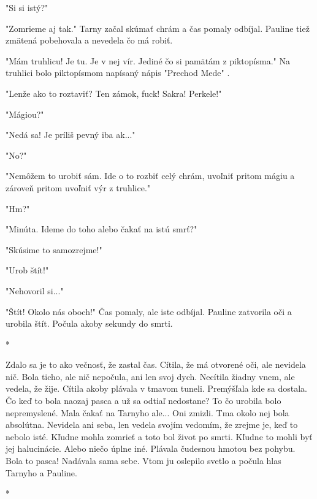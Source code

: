 \documentclass{book}
\begin{document}
"$ $Si si istý?"$ $ 

"$ $Zomrieme aj tak."$ $  Tarny začal skúmať chrám a čas pomaly odbíjal. Pauline tiež zmätená pobehovala a nevedela čo má robiť.

"$ $Mám truhlicu! Je tu. Je v nej vír. Jediné čo si pamätám z piktopísma."$ $  Na truhlici bolo piktopísmom napísaný nápis "$ $Prechod Mede"$ $ .

"$ $Lenže ako to roztaviť? Ten zámok, fuck! Sakra! Perkele!"$ $ 

"$ $Mágiou?"$ $ 

"$ $Nedá sa! Je príliš pevný iba ak..."$ $ 

"$ $No?"$ $ 

"$ $Nemôžem to urobiť sám. Ide o to rozbiť celý chrám, uvoľniť pritom mágiu a zároveň pritom uvoľniť výr z truhlice."$ $ 

"$ $Hm?"$ $ 

"$ $Minúta. Ideme do toho alebo čakať na istú smrť?"$ $ 

"$ $Skúsime to samozrejme!"$ $ 

"$ $Urob štít!"$ $ 

"$ $Nehovoril si..."$ $ 

"$ $Štít! Okolo nás oboch!"$ $  Čas pomaly, ale iste odbíjal. Pauline zatvorila oči a urobila štít. Počula akoby sekundy do smrti.

\begin{center}

*

\end{center}

Zdalo sa je to ako večnosť, že zastal čas. Cítila, že má otvorené oči, ale nevidela nič. Bola ticho, ale nič nepočula, ani len svoj dych. Necítila žiadny vnem, ale vedela, že žije. Cítila akoby plávala v tmavom tuneli. Premýšľala kde sa dostala. Čo keď to bola naozaj pasca a už sa odtiaľ nedostane? To čo urobila bolo nepremyslené. Mala čakať na Tarnyho ale... Oni zmizli. Tma okolo nej bola absolútna. Nevidela ani seba, len vedela svojím vedomím, že zrejme je, keď to nebolo isté. Kľudne mohla zomrieť a toto bol život po smrti. Kľudne to mohli byť jej halucinácie. Alebo niečo úplne iné. Plávala čudesnou hmotou bez pohybu. Bola to pasca! Nadávala sama sebe. Vtom ju oslepilo svetlo a počula hlas Tarnyho a Pauline.

\begin{center}

*

\end{center}
\end{document}
